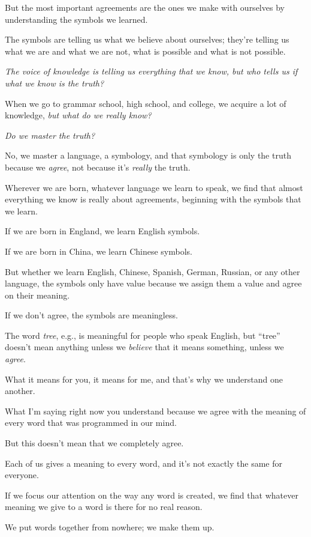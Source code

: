 \documentclass{article}
\numberwithin{equation}{section}
\begin{document}
But the most important agreements are the ones we make with ourselves by understanding the symbols we learned.

The symbols are telling us what we believe about ourselves; they're telling us what we are and what we are not, what is possible and what is not possible.

\textit{The voice of knowledge is telling us everything that we know, but who tells us if what we know is the truth?}

%
When we go to grammar school, high school, and college, we acquire a lot of knowledge, \textit{but what do we really know?}

\textit{Do we master the truth?}

No, we master a language, a symbology, and that symbology is only the truth because we \textit{agree}, not because it's \textit{really} the truth.

Wherever we are born, whatever language we learn to speak, we find that almost everything we know is really about agreements, beginning with the symbols that we learn.

%
If we are born in England, we learn English symbols.

If we are born in China, we learn Chinese symbols.

But whether we learn English, Chinese, Spanish, German, Russian, or any other language, the symbols only have value because we assign them a value and agree on their meaning.

If we don't agree, the symbols are meaningless.

The word \textit{tree}, e.g., is meaningful for people who speak English, but ``tree'' doesn't mean anything unless we \textit{believe} that it means something, unless we \textit{agree}.

What it means for you, it means for me, and that's why we understand one another.

What I'm saying right now you understand because we agree with the meaning of every word that was programmed in our mind.

But this doesn't mean that we completely agree.

Each of us gives a meaning to every word, and it's not exactly the same for everyone.

%
If we focus our attention on the way any word is created, we find that whatever meaning we give to a word is there for no real reason.

We put words together from nowhere; we make them up.
\end{document}

